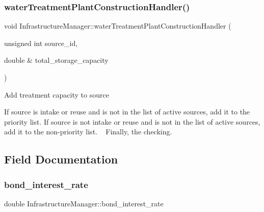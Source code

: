 \subsubsection{\texorpdfstring{water\+Treatment\+Plant\+Construction\+Handler()}{waterTreatmentPlantConstructionHandler()}}
{\footnotesize\ttfamily void Infrastructure\+Manager\+::water\+Treatment\+Plant\+Construction\+Handler (\begin{DoxyParamCaption}\item[{unsigned int}]{source\+\_\+id,  }\item[{double \&}]{total\+\_\+storage\+\_\+capacity }\end{DoxyParamCaption})}

Add treatment capacity to source

If source is intake or reuse and is not in the list of active sources, add it to the priority list. If source is not intake or reuse and is not in the list of active sources, add it to the non-\/priority list. ~\newline
 Finally, the checking. 

\subsection{Field Documentation}
\mbox{\label{classInfrastructureManager_ab8ddaa0ed220e29bc296470b7a905a3b_ab8ddaa0ed220e29bc296470b7a905a3b}} 
\subsubsection{\texorpdfstring{bond\+\_\+interest\+\_\+rate}{bond\_interest\_rate}}
{\footnotesize\ttfamily double Infrastructure\+Manager\+::bond\+\_\+interest\+\_\+rate\hspace{0.3cm}{\ttfamily [private]}}

\mbox{\label{classInfrastructureManager_a6c8010bc7c65fac8411431e5c7a8d3e4_a6c8010bc7c65fac8411431e5c7a8d3e4}} 
